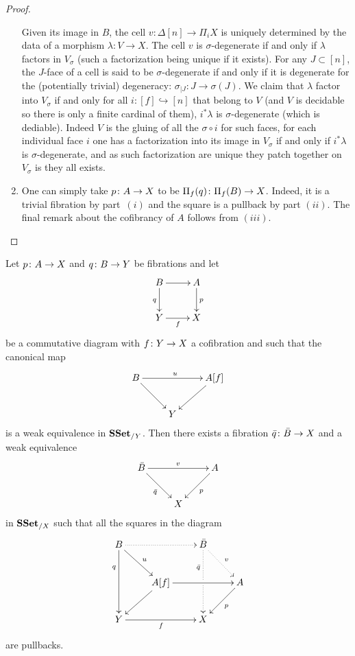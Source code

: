 \documentclass[reqno,10pt,a4paper,oneside,draft]{amsart}
\begin{document}
\begin{proof}
\begin{enumerate}[$(i)$]
Given its image in $B$, the cell $v: \Delta[n] \rightarrow \Pi_i X$ is uniquely determined by the data of a morphism $\lambda: V\rightarrow X$. The cell $v$ is $\sigma$-degenerate if and only if $\lambda$ factors in $V_{\sigma}$ (such a factorization being unique if it exists). For any $J \subset [n]$, the $J$-face of a cell is said to be $\sigma$-degenerate if and only if it is degenerate for the (potentially trivial) degeneracy: $\sigma_{|J} : J \rightarrow \sigma(J)$. We claim that $\lambda$ factor into $V_{\sigma}$ if and only for all $i:[f] \hookrightarrow [n]$ that belong to $V$ (and $V$ is decidable so there is only a finite cardinal of them), $i^* \lambda$ is $\sigma$-degenerate (which is dediable). Indeed $V$ is the gluing of all the $\sigma \circ i$ for such faces, for each individual face $i$ one has a factorization into its image in $V_{\sigma}$ if and only if $i^* \lambda$ is $\sigma$-degenerate, and as such factorization are unique they patch together on $V_{\sigma}$ is they all exists.

\item One can simply take $p \colon A \to X$ to be $\Pi_f(q) \colon \Pi_f(B) \to X$. Indeed, it is a trivial fibration by part~$(i)$ and the square is a pullback by part $(ii)$. The final remark about the cofibrancy of 
$A$ follows from $(iii)$. \qedhere
\end{enumerate}
\end{proof}





\begin{proposition}
\label{Prop:Homotopy_ext_prop}
Let $p \colon A \to X$ and $q \colon B \to Y$ be fibrations and let
\[
\xymatrix{
B \ar[r] \ar[d]_q & A \ar[d]^p \\
Y \ar[r]_f & X}
\]
be a commutative diagram with $f \colon Y \to X$ a cofibration and such that the canonical map
\begin{equation}
\label{equ:gluedata}
\begin{gathered}
\xymatrix{
B \ar[rr]^{u} \ar[dr] &  & A[f] \ar[dl] \\
 & Y &}
 \end{gathered}
 \end{equation}
is a weak equivalence in $\mathbf{SSet}_{/ Y}$. Then there exists a fibration $\bar{q} \colon \bar{B} \to X$ and a weak equivalence
\[
\xymatrix{
\bar{B} \ar[rr]^{v} \ar[dr]_{\bar{q}} &  & A \ar[dl]^{p} \\
 & X &}
 \]
 in $\mathbf{SSet}_{/X}$ such that all the squares in the diagram
\[ 
\xymatrix{
 B
  \ar@{.>}[rr]
  \ar[dr]^{u}
  \ar[dd]_(.3){q}
&&
  \bar{B}
  \ar@{.>}[dr]^{v}
  \ar@{.>}[dd]_(.3){\bar{q}}|{\hole}
&\\&
  A[f] 
  \ar[rr]
  \ar[dl]
&&
  A
  \ar[dl]^{p}
\\
  Y
  \ar[rr]_{f}
&&
  X
&
}
\]
are pullbacks. 
\end{proposition}
\end{document}
